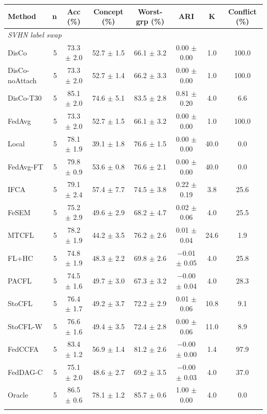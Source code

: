 {\scriptsize
\begin{tabular}{l r c c c c c c}
\toprule
Method & n & Acc (\%) & Concept (\%) & Worst-grp (\%) & ARI & K & Conflict (\%) \\
\midrule
\multicolumn{8}{l}{\textit{SVHN label swap}} \\
DisCo & 5 & 73.3 $\pm$ 2.0 & 52.7 $\pm$ 1.5 & 66.1 $\pm$ 3.2 & 0.00 $\pm$ 0.00 & 1.0 & 100.0 \\
DisCo-noAttach & 5 & 73.3 $\pm$ 2.0 & 52.7 $\pm$ 1.4 & 66.2 $\pm$ 3.3 & 0.00 $\pm$ 0.00 & 1.0 & 100.0 \\
DisCo-T30 & 5 & 85.1 $\pm$ 2.0 & 74.6 $\pm$ 5.1 & 83.5 $\pm$ 2.8 & 0.81 $\pm$ 0.20 & 4.0 & 6.6 \\
FedAvg & 5 & 73.3 $\pm$ 2.0 & 52.7 $\pm$ 1.5 & 66.1 $\pm$ 3.2 & 0.00 $\pm$ 0.00 & 1.0 & 100.0 \\
Local & 5 & 78.1 $\pm$ 1.9 & 39.1 $\pm$ 1.8 & 76.6 $\pm$ 1.5 & 0.00 $\pm$ 0.00 & 40.0 & 0.0 \\
FedAvg-FT & 5 & 79.8 $\pm$ 0.9 & 53.6 $\pm$ 0.8 & 76.6 $\pm$ 2.1 & 0.00 $\pm$ 0.00 & 40.0 & 0.0 \\
IFCA & 5 & 79.1 $\pm$ 2.4 & 57.4 $\pm$ 7.7 & 74.5 $\pm$ 3.8 & 0.22 $\pm$ 0.19 & 3.8 & 25.6 \\
FeSEM & 5 & 75.2 $\pm$ 2.9 & 49.6 $\pm$ 2.9 & 68.2 $\pm$ 4.7 & 0.02 $\pm$ 0.06 & 4.0 & 25.5 \\
MTCFL & 5 & 78.2 $\pm$ 1.9 & 44.2 $\pm$ 3.5 & 76.2 $\pm$ 2.6 & 0.01 $\pm$ 0.04 & 24.6 & 1.9 \\
FL+HC & 5 & 74.8 $\pm$ 1.9 & 48.3 $\pm$ 2.2 & 69.8 $\pm$ 2.6 & $-$0.01 $\pm$ 0.05 & 4.0 & 25.8 \\
PACFL & 5 & 74.5 $\pm$ 1.6 & 49.7 $\pm$ 3.0 & 67.3 $\pm$ 3.2 & $-$0.00 $\pm$ 0.04 & 4.0 & 28.3 \\
StoCFL & 5 & 76.4 $\pm$ 1.7 & 49.2 $\pm$ 3.7 & 72.2 $\pm$ 2.9 & 0.01 $\pm$ 0.06 & 10.8 & 9.1 \\
StoCFL-W & 5 & 76.6 $\pm$ 1.6 & 49.4 $\pm$ 3.5 & 72.4 $\pm$ 2.8 & 0.00 $\pm$ 0.06 & 11.0 & 8.9 \\
FedCCFA & 5 & 83.4 $\pm$ 1.2 & 56.9 $\pm$ 1.4 & 81.2 $\pm$ 2.6 & $-$0.00 $\pm$ 0.00 & 1.4 & 97.9 \\
FedDAG-C & 5 & 75.1 $\pm$ 2.0 & 48.6 $\pm$ 2.7 & 69.2 $\pm$ 3.5 & $-$0.00 $\pm$ 0.03 & 4.0 & 37.0 \\
Oracle & 5 & 86.5 $\pm$ 0.6 & 78.1 $\pm$ 1.2 & 85.7 $\pm$ 0.6 & 1.00 $\pm$ 0.00 & 4.0 & 0.0 \\
\addlinespace
\multicolumn{8}{l}{\textit{CIFAR-10 rotation}} \\

\end{tabular}}
